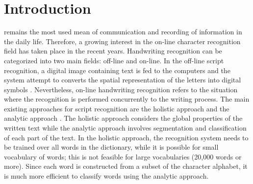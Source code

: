 \documentclass[journal,compsoc]{IEEEtran}
\begin{document}
\IEEEdisplaynotcompsoctitleabstractindextext

\section{Introduction}
\date
{} remains the most used mean of communication and recording of information in the daily life. Therefore, a growing interest in the on-line character recognition field has taken place in the recent years.
Handwriting recognition can be categorized into two main fields: off-line and on-line. In the off-line script recognition, a digital image containing text is fed to the computers and the system attempt to converts the spatial representation of the letters into digital symbols \cite{al2011online}. Nevertheless, on-line handwriting recognition refers to the situation where the recognition is performed concurrently to the writing process. The main existing approaches for script recognition are the holistic approach \cite{biadsy2011segmentation} and the analytic approach \cite{abdulla2008off, sari2002off, Dinges2011, elanwar2012unconstrained}. The holistic approach considers the global properties of the written text while the analytic approach involves segmentation and classification of each part of the text.  In the holistic approach, the recognition system needs to be trained over all words in the dictionary, while it is possible for small vocabulary of words; this is not feasible for large vocabularies (20,000 words or more). Since each word is constructed from a subset of the character alphabet, it is much more efficient to classify words using the analytic approach. \cite{elanwar2012unconstrained} \\
\end{document}

